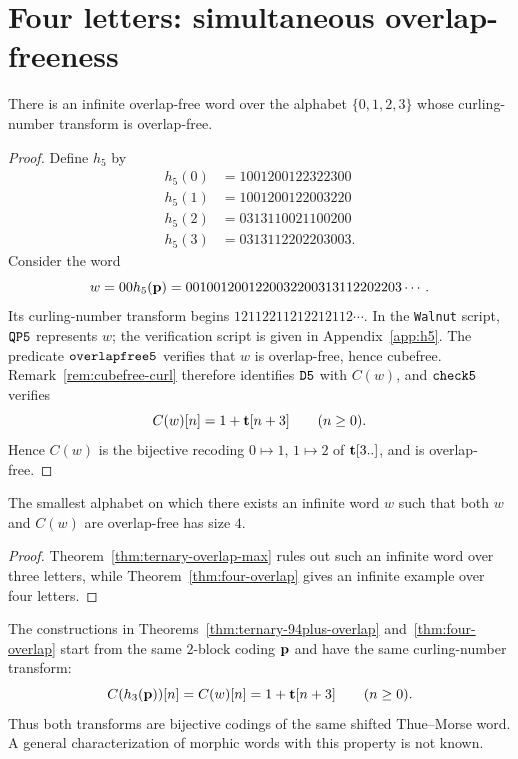 \documentclass[12pt,reqno]{article}
\begin{document}
\section{Four letters: simultaneous overlap-freeness}
\label{sec:four}

\begin{theorem} 
\label{thm:four-overlap}
There is an infinite overlap-free word over the alphabet $\{0,1,2,3\}$ whose curling-number transform is overlap-free. 
\end{theorem}

\begin{proof} 
Define $h_5$ by
\begin{align*} 
h_5(0) &= 1001200122322300\\
h_5(1) &= 1001200122003220\\
h_5(2) &= 0313110021100200\\
h_5(3) &= 0313112202203003 .
\end{align*}
Consider the word
\[
w=00h_5({\bf p})=0010012001220032200313112202203\cdots.
\]
Its curling-number transform begins $12112211212212112\cdots$.  In the {\tt Walnut} script, ${\tt QP5}$ represents $w$; the verification script is given in Appendix~\ref{app:h5}.  The predicate ${\tt overlapfree5}$ verifies that $w$ is overlap-free, hence cubefree.  Remark~\ref{rem:cubefree-curl} therefore identifies ${\tt D5}$ with $C(w)$, and ${\tt check5}$ verifies
\[
C(w)[n]=1+{\bf t}[n+3]\qquad(n\ge 0).
\]
Hence $C(w)$ is the bijective recoding $0\mapsto1$, $1\mapsto2$ of ${\bf t}[3..]$, and is overlap-free.
\end{proof}


\begin{corollary}
\label{cor:alphabet-threshold}
The smallest alphabet on which there exists an infinite word $w$ such that both $w$ and $C(w)$ are overlap-free has size $4$.
\end{corollary}

\begin{proof}
Theorem~\ref{thm:ternary-overlap-max} rules out such an infinite word over three letters, while Theorem~\ref{thm:four-overlap} gives an infinite example over four letters.
\end{proof}

\begin{remark}
The constructions in Theorems~\ref{thm:ternary-94plus-overlap} and~\ref{thm:four-overlap} start from the same $2$-block coding ${\bf p}$ and have the same curling-number transform:
\[
C(h_3({\bf p}))[n]=C(w)[n]=1+{\bf t}[n+3]\qquad(n\ge 0).
\]
Thus both transforms are bijective codings of the same shifted Thue--Morse word.  A general characterization of morphic words with this property is not known.
\end{remark}
\end{document}
